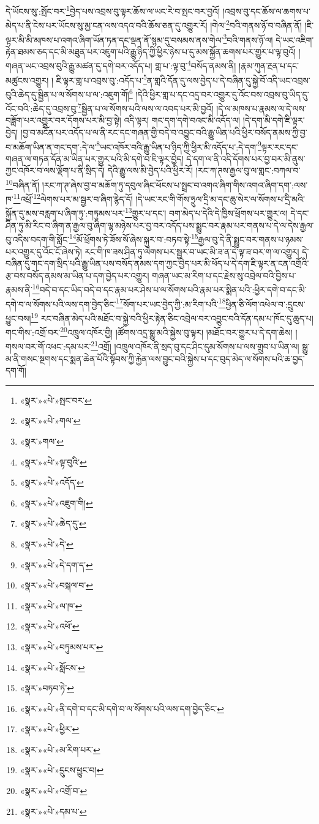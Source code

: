 དེ་ཡོངས་སུ་:སྤོང་བར་\footnote{«སྣར་»«པེ་»སྤང་བར་}བྱེད་པས་འབྲས་བུ་ལྟར་ཆོས་ལ་ཡང་རེ་བ་སྤང་བར་བྱའོ། །འབྲས་བུ་དང་ཆོས་ལ་ཆགས་པ་མེད་པ་ནི་ངེས་པར་ཡོངས་སུ་མྱ་ངན་ལས་འདའ་བའི་ཆོས་ཅན་དུ་འགྱུར་རོ། །གེལ་\footnote{«སྣར་»«པེ་»གལ་}བའི་གནས་ཉོ་བ་བཞིན་ནོ། །ཇི་ལྟར་མི་མི་མཁས་པ་འགའ་ཞིག་ཡོན་ཏན་དང་ལྡན་ནོ་སྙམ་དུ་བསམས་ནས་གེལ་\footnote{«སྣར་»གལ་}བའི་གནས་ཉོ་ལ། དེ་ཡང་འཇིག་རྟེན་ཐམས་ཅད་དང་མི་མཐུན་པར་འཇུག་པའི་རྒྱུ་ཉིད་ཀྱི་ཕྱིར་ཉེས་པ་དུ་མས་སྐྱོན་ཆགས་པར་གྱུར་པ་ལྟ་བུའོ། །གཞན་ཡང་འབྲས་བུའི་རྒྱུ་མཚན་དུ་དགེ་བར་འདོད་པ། གླ་པ་:ལྟ་བུ་\footnote{«སྣར་»«པེ་»ལྟ་བུའི་}བསོད་ནམས་ནི། །རྣམ་ཀུན་རྔན་པ་དང་མཚུངས་འགྱུར། །
ཇི་ལྟར་གླ་པ་འབྲས་བུ་:འདོད་པ་\footnote{«སྣར་»«པེ་»འདོད་}ན་གླའི་དོན་དུ་ལས་བྱེད་པ་དེ་བཞིན་དུ་སྐྱེ་བོ་འདི་ཡང་འབྲས་བུའི་ཆེད་དུ་སྦྱིན་པ་ལ་སོགས་པ་ལ་:འཇུག་གོ།\footnote{«སྣར་»«པེ་»འཇུག་གི།} །དེའི་ཕྱིར་གླ་པ་དང་འདྲ་བར་འགྱུར་དུ་འོང་བས་འབྲས་བུ་ཡིད་དུ་འོང་བའི་:ཆེད་དུ་འབྲས་བུ་\footnote{«སྣར་»«པེ་»ཆེད་དུ་}སྦྱིན་པ་ལ་སོགས་པའི་ལས་ལ་འབད་པར་མི་བྱའོ། །དེ་ལ་མཁས་པ་རྣམས་ལ་དེ་ལས་བཟློག་པར་འགྱུར་བར་དོགས་པར་མི་བྱ་སྟེ། འདི་ལྟར། གང་དག་དགེ་བའང་མི་འདོད་ལ། །དེ་དག་མི་དགེ་ཇི་ལྟར་བྱེད། །བྱ་བ་མངོན་པར་འདོད་པ་ལ་ནི་རང་དང་གཞན་གྱི་བདེ་བ་འབྱུང་བའི་རྒྱུ་ཡིན་པའི་ཕྱིར་བསོད་ནམས་ཀྱི་བྱ་བ་མཆོག་ཡིན་ན་གང་དག་:དེ་ལ་\footnote{«སྣར་»«པེ་»དེ་}ཡང་འཁོར་བའི་རྒྱུ་ཡིན་པ་ཉིད་ཀྱི་ཕྱིར་མི་འདོད་པ་:དེ་དག་\footnote{«སྣར་»«པེ་»དེ་དག་ད་}ལྟར་རང་དང་གཞན་ལ་གཏན་དོན་མ་ཡིན་པར་གྱུར་པའི་མི་དགེ་བ་ཇི་ལྟར་བྱེད། དེ་དག་ལ་ནི་འདི་དོགས་པར་བྱ་བར་མི་ནུས་ཀྱང་འཁོར་བ་ལས་ལྡོག་པ་ནི་སྲིད་དེ། དེའི་རྒྱུ་ལས་མི་བྱེད་པའི་ཕྱིར་རོ། །རང་ཀ་ཊས་རྒྱལ་བུ་ལ་གླང་:བཀལ་བ་\footnote{«སྣར་»«པེ་»བསྐལ་བ་}བཞིན་ནོ། །རང་ཀ་ཊ་ཞེས་བྱ་བ་མཆོག་ཏུ་དབུལ་ཞིང་ཕོངས་པ་སྤྲང་བ་འགའ་ཞིག་གིས་འགའ་ཞིག་དག་:ལས་ཁ་\footnote{«སྣར་»«པེ་»ལ་ཁ་}འཕྲོ་\footnote{«སྣར་»«པེ་»འཕོ་}ལེགས་པར་མ་སྦྱར་བ་ཞིག་རྙེད་དོ། །དེ་ཡང་རང་གི་གོས་ཧྲུལ་དྲི་མ་དང་ཆུ་སེར་ལ་སོགས་པ་དྲི་མའི་སྐྱོན་དུ་མས་བརླག་པ་ཞིག་ཏུ་:གཏུམས་པར་\footnote{«སྣར་»«པེ་»བཏུམས་པར་}གྱུར་པ་དང་། བག་མེད་པ་དེའི་དེ་ཁྱིས་ཕྲོགས་པར་གྱུར་ལ། དེ་དང་ཤིན་ཏུ་མི་རིང་བ་ཞིག་ན་རྒྱལ་བུ་ཞིག་ལྷ་མཉེས་པར་བྱ་བར་འདོད་པས་སྨྱུང་བར་རྣམ་པར་གནས་པ་དེ་ལ་དེས་རྒྱལ་བུ་འདིས་བདག་གི་སློང་\footnote{«སྣར་»«པེ་»སློངས་}མོ་ཕྲོགས་ཏེ་ཟོས་སོ་ཞེས་སྐུར་བ་:བཏབ་སྟེ་\footnote{«སྣར་»བཏབ་ཏེ་}རྒྱལ་བུ་དེ་ནི་སྨྱུང་བར་གནས་པ་ཉམས་པར་འགྱུར་དུ་འོང་ངོ་ཞེས་ཏེ། རང་གི་ཁ་ཟས་ཤིན་ཏུ་ལེགས་པར་སྦྱར་བ་ཡང་མི་ཟ་ན་དེ་ལྟ་ཟ་བར་ག་ལ་འགྱུར། དེ་བཞིན་དུ་གང་དག་སྲིད་པའི་རྒྱུ་ཡིན་པས་བསོད་ནམས་དག་ཀྱང་བྱེད་པར་མི་ཕོད་པ་དེ་དག་ཇི་ལྟར་ན་ངན་འགྲོའི་རྩ་བས་བསོད་ནམས་མ་ཡིན་པ་དག་བྱེད་པར་འགྱུར། གཞན་ཡང་མ་རིག་པ་དང་རྗེས་སུ་འབྲེལ་བའི་བྱིས་པ་རྣམས་ནི་\footnote{«སྣར་»«པེ་»ནི་དགེ་བ་དང་མི་དགེ་བ་ལ་སོགས་པའི་ལས་དག་བྱེད་ཅིང་}བདེ་བ་དང་ཡིད་བདེ་བ་དང་རྣམ་པར་ཤེས་པ་ལ་སོགས་པའི་རྣམ་པར་སྨིན་པའི་:ཕྱིར་དགེ་བ་དང་མི་དགེ་བ་ལ་སོགས་པའི་ལས་དག་བྱེད་ཅིང་\footnote{«སྣར་»«པེ་»ཕྱིར་}སོག་པར་ཡང་བྱེད་ཀྱི་:མ་རིག་པའི་\footnote{«སྣར་»«པེ་»མ་རིག་པར་}ཕྱིན་ཅི་ལོག་འཕེལ་བ་:དྲུངས་ཕྱུང་བས།\footnote{«སྣར་»«པེ་»དྲུངས་ཕྱུང་བ།} རང་བཞིན་མེད་པའི་མཐོང་བ་སྐྱེ་བའི་ཕྱིར་རྟེན་ཅིང་འབྲེལ་བར་འབྱུང་བའི་དོན་དམ་པ་ཁོང་དུ་ཆུད་པ། གང་གིས་:འགྲོ་བར་\footnote{«སྣར་»«པེ་»འགྲོ་བ་}འཁྲུལ་འཁོར་གྱི། །ཚོགས་འདྲ་སྒྱུ་མའི་སྐྱེས་བུ་ལྟར། །མཐོང་བར་གྱུར་པ་དེ་དག་ཆེས། །གསལ་བར་གོ་འཕང་:དམ་པར་\footnote{«སྣར་»«པེ་»དམ་པ་}འགྲོ། །འཁྲུལ་འཁོར་ནི་སྲད་བུ་དང་ཤིང་དུམ་སོགས་པ་ལས་གྲུབ་པ་ཡིན་ལ། སྒྱུ་མ་ནི་གསང་སྔགས་དང་སྨན་ཆེན་པོའི་སྟོབས་ཀྱི་རྐྱེན་ལས་བྱུང་བའི་སྐྱེས་པ་དང་བུད་མེད་ལ་སོགས་པའི་ཆ་བྱད་དག་གོ། 